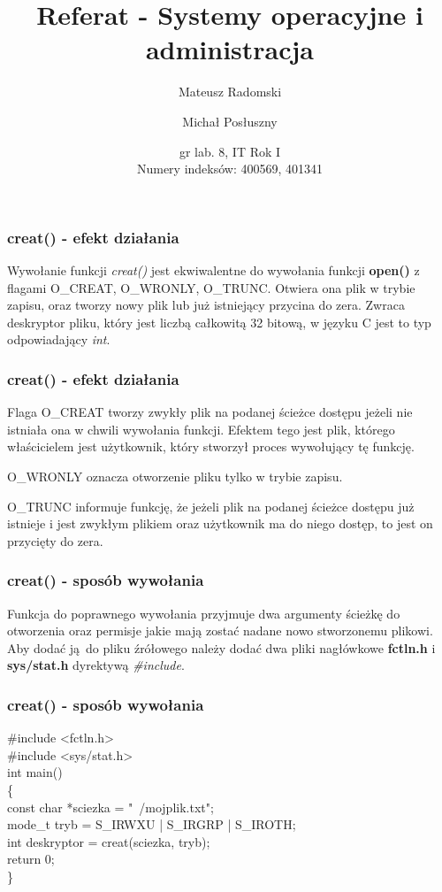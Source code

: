 \documentclass{beamer}
\title{Referat - Systemy operacyjne i administracja}
\author{Mateusz Radomski \and Michał Posłuszny}
\date{gr lab. 8, IT Rok I \\ Numery indeksów: 400569, 401341 }
\begin{document}
\maketitle
\begin{frame}
	\frametitle{creat() - efekt działania}
	Wywołanie funkcji \textit{creat()} jest ekwiwalentne do wywołania funkcji \textbf{open()} z flagami O\_CREAT, O\_WRONLY, O\_TRUNC.
	Otwiera ona plik w trybie zapisu, oraz tworzy nowy plik lub już istniejący przycina do zera.
	Zwraca deskryptor pliku, który jest liczbą całkowitą 32 bitową, w języku C jest to typ odpowiadający \textit{int}.
\end{frame}

\begin{frame}
	\frametitle{creat() - efekt działania}
	Flaga O\_CREAT tworzy zwykły plik na podanej ścieżce dostępu jeżeli nie istniała ona w chwili wywołania funkcji. Efektem tego jest plik, którego właścicielem jest użytkownik, który stworzył proces wywołujący tę funkcję.

	O\_WRONLY oznacza otworzenie pliku tylko w trybie zapisu.

	O\_TRUNC informuje funkcję, że jeżeli plik na podanej ścieżce dostępu już istnieje i jest zwykłym plikiem oraz użytkownik ma do niego dostęp, to jest on przycięty do zera.
\end{frame}

\begin{frame}
	\frametitle{creat() - sposób wywołania}
Funkcja do poprawnego wywołania przyjmuje dwa argumenty ścieżkę do otworzenia oraz permisje jakie mają zostać nadane nowo stworzonemu plikowi.
Aby dodać ją do pliku źrółowego należy dodać dwa pliki nagłówkowe \textbf{fctln.h} i \textbf{sys/stat.h} dyrektywą \textit{\#include}.
\end{frame}

\begin{frame}
	\frametitle{creat() - sposób wywołania}
\#include <fctln.h>\\
\#include <sys/stat.h>\\
int main()\\
\{\\
	const char *sciezka = "~/mojplik.txt";\\
	mode\_t tryb = S\_IRWXU | S\_IRGRP | S\_IROTH;\\
	int deskryptor = creat(sciezka, tryb);\\
	return 0;\\
\}
\end{frame}
\end{document}
